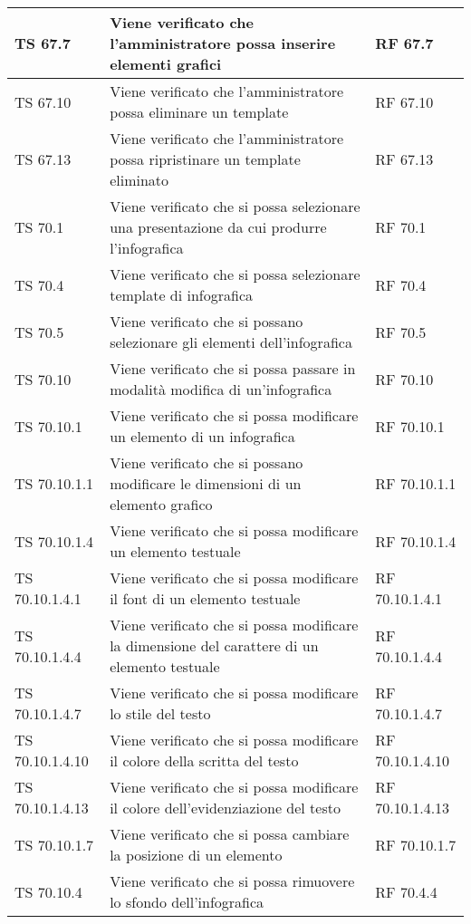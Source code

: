 {{\begin{longtable} [c]{| p{3cm} | p{6cm} |p{3cm}|}
			\hline
			TS 67.7 & Viene verificato che l'amministratore possa inserire elementi grafici & RF 67.7\\
			\hline
			TS 67.10 & Viene verificato che l'amministratore possa eliminare un template\ped{g} & RF 67.10\\
			\hline
			TS 67.13 & Viene verificato che l'amministratore possa ripristinare un template eliminato & RF 67.13\\
			\hline
			TS 70.1 & Viene verificato che si possa selezionare una presentazione da cui produrre l'infografica\ped{g}  & RF 70.1\\
			\hline
			TS 70.4 & Viene verificato che si possa selezionare template\ped{g} di infografica\ped{g} & RF 70.4\\
			\hline
			TS 70.5 & Viene verificato che si possano selezionare gli elementi dell'infografica  & RF 70.5\\
			\hline
			TS 70.10 & Viene verificato che si possa passare in modalità modifica di un'infografica\ped{g} & RF 70.10\\
			\hline
			TS 70.10.1 & Viene verificato che si possa modificare un elemento di un infografica\ped{g} & RF 70.10.1\\
			\hline
			TS 70.10.1.1 & Viene verificato che si possano modificare le dimensioni di un elemento grafico & RF 70.10.1.1\\
			\hline
			TS 70.10.1.4 & Viene verificato che si possa modificare un elemento testuale  & RF 70.10.1.4\\
			\hline
			TS 70.10.1.4.1 & Viene verificato che si possa modificare il font\ped{g} di un elemento testuale & RF 70.10.1.4.1\\
			\hline
			TS 70.10.1.4.4 & Viene verificato che si possa modificare la dimensione del carattere di un elemento testuale & RF 70.10.1.4.4\\
			\hline
			TS 70.10.1.4.7 & Viene verificato che si possa modificare lo stile del testo & RF 70.10.1.4.7\\
			\hline
			TS 70.10.1.4.10 & Viene verificato che si possa modificare il colore della scritta del testo & RF 70.10.1.4.10\\
			\hline
			TS 70.10.1.4.13 & Viene verificato che si possa modificare il colore dell'evidenziazione del testo & RF 70.10.1.4.13\\
			\hline
			TS 70.10.1.7 & Viene verificato che si possa cambiare la posizione di un elemento & RF 70.10.1.7\\
			\hline
			TS 70.10.4 & Viene verificato che si possa rimuovere lo sfondo dell'infografica\ped{g} & RF 70.4.4\\

\end{longtable}}}

